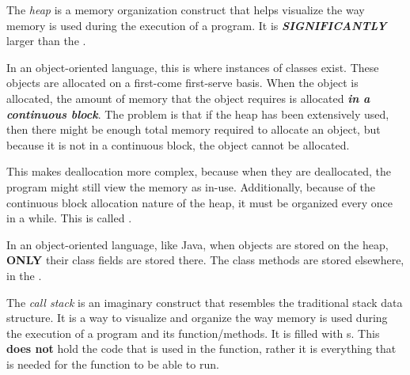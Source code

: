 \begin{definition}[Heap]\label{def:Heap}
  The \emph{heap} is a memory organization construct that helps visualize the way memory is used during the execution of a program.
  It is \textbf{\emph{SIGNIFICANTLY}} larger than the .

  In an object-oriented language, this is where instances of classes exist.
  These objects are allocated on a first-come first-serve basis.
  When the object is allocated, the amount of memory that the object requires is allocated \textbf{\emph{in a continuous block}}.
  The problem is that if the heap has been extensively used, then there might be enough total memory required to allocate an object, but because it is not in a continuous block, the object cannot be allocated.
  
  This makes deallocation more complex, because when they are deallocated, the program might still view the memory as in-use.
  Additionally, because of the continuous block allocation nature of the heap, it must be organized every once in a while.
  This is called .

  \begin{remark}
    In an object-oriented language, like Java, when objects are stored on the heap, \textbf{ONLY} their class fields are stored there.
    The class methods are stored elsewhere, in the .
  \end{remark}
\end{definition}

\begin{definition}\label{def:Call_Stack}
  The \emph{call stack} is an imaginary construct that resembles the traditional stack data structure.
  It is a way to visualize and organize the way memory is used during the execution of a program and its function/methods.
  It is filled with s.
  This \textbf{does not} hold the code that is used in the function, rather it is everything that is needed for the function to be able to run.
\end{definition}

